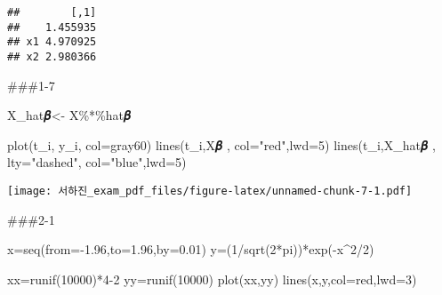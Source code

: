 \documentclass[
]{article}
\newenvironment{Shaded}{\begin{snugshade}}{\end{snugshade}}
\newcommand{\AttributeTok}[1]{\textcolor[rgb]{0.77,0.63,0.00}{#1}}
\newcommand{\DecValTok}[1]{\textcolor[rgb]{0.00,0.00,0.81}{#1}}
\newcommand{\FloatTok}[1]{\textcolor[rgb]{0.00,0.00,0.81}{#1}}
\newcommand{\FunctionTok}[1]{\textcolor[rgb]{0.00,0.00,0.00}{#1}}
\newcommand{\NormalTok}[1]{#1}
\newcommand{\OtherTok}[1]{\textcolor[rgb]{0.56,0.35,0.01}{#1}}
\newcommand{\SpecialCharTok}[1]{\textcolor[rgb]{0.00,0.00,0.00}{#1}}
\newcommand{\StringTok}[1]{\textcolor[rgb]{0.31,0.60,0.02}{#1}}
\begin{document}
\begin{verbatim}
##        [,1]
##    1.455935
## x1 4.970925
## x2 2.980366
\end{verbatim}

\#\#\#1-7

\begin{Shaded}
\begin{Highlighting}[]
\NormalTok{X\_hat𝜷}\OtherTok{\textless{}{-}}\NormalTok{ X}\SpecialCharTok{\%*\%}\NormalTok{hat𝜷}

\FunctionTok{plot}\NormalTok{(t\_i, y\_i, }\AttributeTok{col=}\StringTok{\textquotesingle{}gray60\textquotesingle{}}\NormalTok{)}
\FunctionTok{lines}\NormalTok{(t\_i,X𝜷 , }\AttributeTok{col=}\StringTok{"red"}\NormalTok{,}\AttributeTok{lwd=}\StringTok{\textquotesingle{}5\textquotesingle{}}\NormalTok{)}
\FunctionTok{lines}\NormalTok{(t\_i,X\_hat𝜷 , }\AttributeTok{lty=}\StringTok{"dashed"}\NormalTok{, }\AttributeTok{col=}\StringTok{"blue"}\NormalTok{,}\AttributeTok{lwd=}\StringTok{\textquotesingle{}5\textquotesingle{}}\NormalTok{)}
\end{Highlighting}
\end{Shaded}

\texttt{[image: 서하진\_exam\_pdf\_files/figure-latex/unnamed-chunk-7-1.pdf]}

\#\#\#2-1

\begin{Shaded}
\begin{Highlighting}[]
\NormalTok{x}\OtherTok{=}\FunctionTok{seq}\NormalTok{(}\AttributeTok{from=}\SpecialCharTok{{-}}\FloatTok{1.96}\NormalTok{,}\AttributeTok{to=}\FloatTok{1.96}\NormalTok{,}\AttributeTok{by=}\FloatTok{0.01}\NormalTok{)}
\NormalTok{y}\OtherTok{=}\NormalTok{(}\DecValTok{1}\SpecialCharTok{/}\FunctionTok{sqrt}\NormalTok{(}\DecValTok{2}\SpecialCharTok{*}\NormalTok{pi))}\SpecialCharTok{*}\FunctionTok{exp}\NormalTok{(}\SpecialCharTok{{-}}\NormalTok{x}\SpecialCharTok{\^{}}\DecValTok{2}\SpecialCharTok{/}\DecValTok{2}\NormalTok{)}

\NormalTok{xx}\OtherTok{=}\FunctionTok{runif}\NormalTok{(}\DecValTok{10000}\NormalTok{)}\SpecialCharTok{*}\DecValTok{4{-}2}
\NormalTok{yy}\OtherTok{=}\FunctionTok{runif}\NormalTok{(}\DecValTok{10000}\NormalTok{)}
\FunctionTok{plot}\NormalTok{(xx,yy)}
\FunctionTok{lines}\NormalTok{(x,y,}\AttributeTok{col=}\StringTok{\textquotesingle{}red\textquotesingle{}}\NormalTok{,}\AttributeTok{lwd=}\DecValTok{3}\NormalTok{)}
\end{Highlighting}
\end{Shaded}
\end{document}
